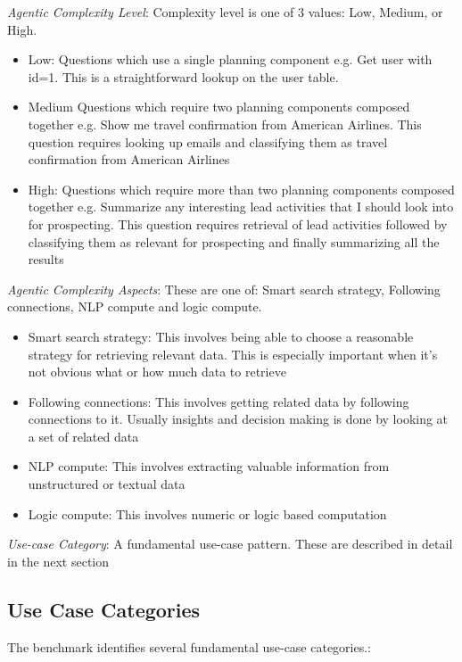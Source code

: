 \documentclass[11pt,a4paper]{article}
\begin{document}
\textit{Agentic Complexity Level}: Complexity level is one of 3 values: Low, Medium, or High.

\begin{itemize}

\item Low: Questions which use a single planning component e.g. Get user with id=1. This is a straightforward lookup on the user table.
\item Medium Questions which require two planning components composed together e.g. Show me travel confirmation from American Airlines. This question requires looking up emails and classifying them as travel confirmation from American Airlines

\item High: Questions which require more than two planning components composed together e.g. Summarize any interesting lead activities that I should look into for prospecting. This question requires retrieval of lead activities followed by classifying them as relevant for prospecting and finally summarizing all the results

\end{itemize}



\textit{Agentic Complexity Aspects}: These are one of: Smart search strategy, Following connections, NLP compute and logic compute.

\begin{itemize}
\item Smart search strategy: This involves being able to choose a reasonable strategy for retrieving relevant data. This is especially important when it's not obvious what or how much data to retrieve
\item Following connections: This involves getting related data by following connections to it. Usually insights and decision making is done by looking at a set of related data
\item NLP compute: This involves extracting valuable information from unstructured or textual data
\item Logic compute: This involves numeric or logic based computation 
\end{itemize}

\textit{Use-case Category}: A fundamental use-case pattern. These are described in detail in the next section

\subsection{Use Case Categories}
The benchmark identifies several fundamental use-case categories.:
\end{document}
